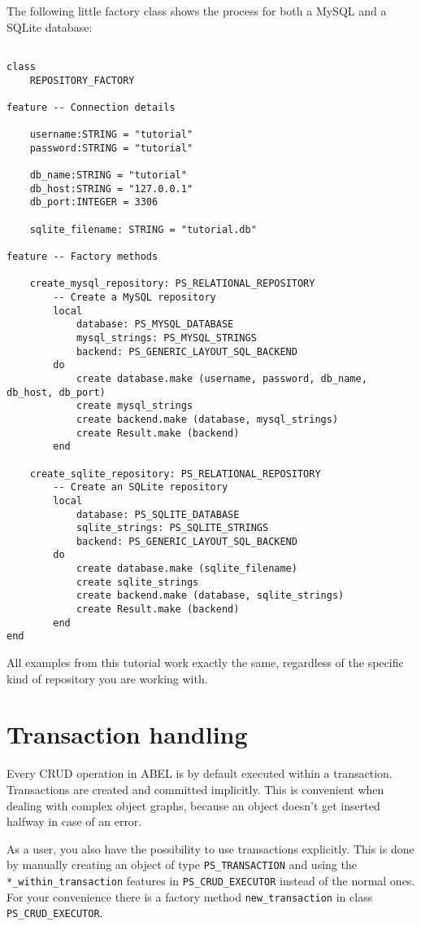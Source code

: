 \documentclass[a4paper,12pt]{report}
\begin{document}
The following little factory class shows the process for both a MySQL and a SQLite database:

\begin{lstlisting}[language=OOSC2Eiffel, captionpos=b, caption={Setting up a MySQL and a SQLite repositories}, label={lst:advanced_initialization}]

class 
	REPOSITORY_FACTORY

feature -- Connection details
	
	username:STRING = "tutorial"
	password:STRING = "tutorial"

	db_name:STRING = "tutorial"
	db_host:STRING = "127.0.0.1"
	db_port:INTEGER = 3306

	sqlite_filename: STRING = "tutorial.db"

feature -- Factory methods

	create_mysql_repository: PS_RELATIONAL_REPOSITORY
		-- Create a MySQL repository
		local
			database: PS_MYSQL_DATABASE
			mysql_strings: PS_MYSQL_STRINGS
			backend: PS_GENERIC_LAYOUT_SQL_BACKEND
		do
			create database.make (username, password, db_name, db_host, db_port)
			create mysql_strings
			create backend.make (database, mysql_strings)
			create Result.make (backend)
		end

	create_sqlite_repository: PS_RELATIONAL_REPOSITORY
		-- Create an SQLite repository
		local
			database: PS_SQLITE_DATABASE
			sqlite_strings: PS_SQLITE_STRINGS
			backend: PS_GENERIC_LAYOUT_SQL_BACKEND
		do
			create database.make (sqlite_filename)
			create sqlite_strings
			create backend.make (database, sqlite_strings)
			create Result.make (backend)
		end
end

\end{lstlisting}

All examples from this tutorial work exactly the same, regardless of the specific kind of repository you are working with.

\chapter{Transaction handling}

Every CRUD operation in ABEL is by default executed within a transaction. 
Transactions are created and committed implicitly. This is convenient when dealing with complex object graphs, because an object doesn't get inserted halfway in case of an error.

As a user, you also have the possibility to use transactions explicitly. 
This is done by manually creating an object of type \lstinline!PS_TRANSACTION! and using the \lstinline!*_within_transaction! features in \lstinline!PS_CRUD_EXECUTOR! instead of the normal ones.
For your convenience there is a factory method \lstinline{new_transaction} in class \lstinline!PS_CRUD_EXECUTOR!.
\end{document}
